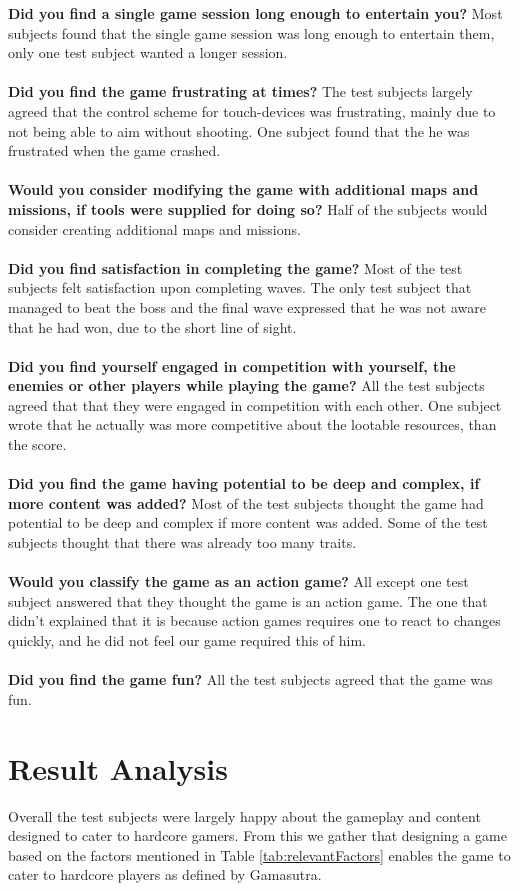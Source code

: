 \textbf{Did you find a single game session long enough to entertain you?}
Most subjects found that the single game session was long enough to entertain them, only one test subject wanted a longer session.\\\\
\textbf{Did you find the game frustrating at times?}
The test subjects largely agreed that the control scheme for touch-devices was frustrating, mainly due to not being able to aim without shooting.
One subject found that the he was frustrated when the game crashed.\\\\
\textbf{Would you consider modifying the game with additional maps and missions, if tools were supplied for doing so?}
Half of the subjects would consider creating additional maps and missions.\\\\
\textbf{Did you find satisfaction in completing the game?}
Most of the test subjects felt satisfaction upon completing waves.
The only test subject that managed to beat the boss and the final wave expressed that he was not aware that he had won, due to the short line of sight.\\\\
\textbf{Did you find yourself engaged in competition with yourself, the enemies or other players while playing the game?}
All the test subjects agreed that that they were engaged in competition with each other.
One subject wrote that he actually was more competitive about the lootable resources, than the score.\\\\
\textbf{Did you find the game having potential to be deep and complex, if more content was added?}
Most of the test subjects thought the game had potential to be deep and complex if more content was added.
Some of the test subjects thought that there was already too many traits.\\\\
\textbf{Would you classify the game as an action game?}
All except one test subject answered that they thought the game is an action game.
The one that didn't explained that it is because action games requires one to react to changes quickly, and he did not feel our game required this of him.\\\\
\textbf{Did you find the game fun?}
All the test subjects agreed that the game was fun.

\section{Result Analysis}
Overall the test subjects were largely happy about the gameplay and content designed to cater to hardcore gamers.
From this we gather that designing a game based on the factors mentioned in Table \ref{tab:relevantFactors} enables the game to cater to hardcore players as defined by Gamasutra\cite{casual_vs_hardcore}.
